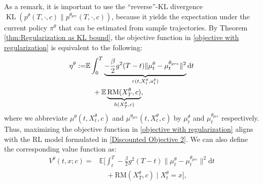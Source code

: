 \documentclass{article}
\theoremstyle{plain}
\theoremstyle{definition}
\theoremstyle{remark}
\begin{document}
As a remark, it is important to use the ``reverse''-KL divergence $\operatorname{KL}\left(p^{\theta}(T,\cdot,c)\| p^{\theta_{pre}}(T,\cdot,c)\right)$, because it yields the expectation under the current policy $\pi^{\theta}$ that can be estimated from sample trajectories.
By Theorem \ref{thm:Regularization as KL bound}, the objective function in \eqref{objective with regularization} is equivalent to the following:
\begin{align}
\label{continuous-time objective with regularization}
\eta^\theta:=&
\mathbb{E} \int_0^{T}\underbrace{-\frac{\beta}{2} g^2(T-t)\|\mu_t^{\theta}-\mu^{\theta_{pre}}_t\|^2}_{r (t,X^\theta_t,a_t^{\theta})} \mathrm{d} t \notag \\
& \quad +\mathbb{E}\underbrace{\text{RM}(X^{\theta}_T,c)}_{h(X^{\theta}_T,c)},
\end{align}
where we abbreviate $\mu^{\theta}(t,X_t^{\theta},c)$ and $\mu^{\theta_{pre}}(t,X_t^{\theta},c)$ by $\mu_t^{\theta}$ and $\mu^{\theta_{pre}}_t$ respectively.
Thus, maximizing the objective function in \eqref{objective with regularization} aligns with the RL model formulated in \eqref{Discounted Objective 2}.
We can also define the corresponding value function as:
\begin{align}
\label{continuous-time value function with regularization}
V^\theta(t,x;c)=& 
\mathbb{E} \bigg[\int_t^{T}-\frac{\beta}{2} g^2(T-t)\|\mu_t^{\theta}-\mu^{\theta_{pre}}_t\|^2\mathrm{d} t  \nonumber\\
&\quad +\text{RM}(X^{\theta}_T,c)\mid X^{\theta}_t=x\bigg] , 
\end{align}
\end{document}
